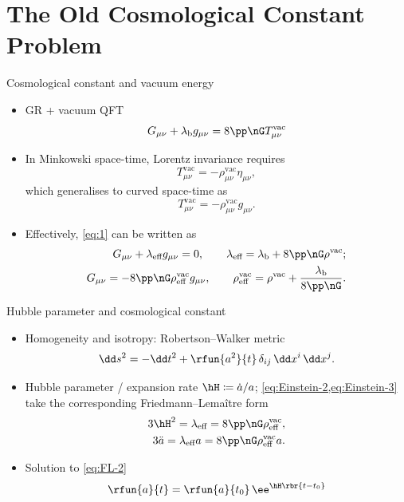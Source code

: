 \documentclass{beamer}
\begin{document}
\section{The Old Cosmological Constant Problem}

\begin{frame}{Cosmological constant and vacuum energy}
\begin{itemize}
\item GR + vacuum QFT
\begin{equation}
G_{\mu\nu} + \lambda_\text{b} g_{\mu\nu} = 8\pp\nG T^\text{vac}_{\mu\nu}
\label{eq:1}
\end{equation}
\item In Minkowski space-time, Lorentz invariance requires
\begin{equation}
T^\text{vac}_{\mu\nu} = -\rho^\text{vac}_{\mu\nu} \eta_{\mu\nu},
\end{equation}
which generalises to curved space-time as
\begin{equation}
T^\text{vac}_{\mu\nu} = -\rho^\text{vac}_{\mu\nu} g_{\mu\nu}.
\end{equation}
\item Effectively, \cref{eq:1} can be written as
\begin{align}
G_{\mu\nu} + \lambda_\text{eff} g_{\mu\nu} = 0, \qquad
\lambda_\text{eff} = \lambda_\text{b} + 8\pp\nG\rho^\text{vac};
\label{eq:Einstein-2}\\
G_{\mu\nu} = -8\pp\nG\rho^\text{vac}_\text{eff} g_{\mu\nu}, \qquad
\rho^\text{vac}_\text{eff} = \rho^\text{vac} +
\frac{\lambda_\text{b}}{8\pp\nG}
\label{eq:Einstein-3}.
\end{align}
\end{itemize}
\end{frame}

\begin{frame}{Hubble parameter and cosmological constant}
\begin{itemize}
\item Homogeneity and isotropy: Robertson--Walker metric
\begin{equation}
\dd s^2 = -\dd t^2 + \rfun{a^2}{t}\,\delta_{ij}\,\dd x^i\,\dd x^j.
\end{equation}
\item Hubble parameter / expansion rate $\hH \coloneqq \dot{a}/a$;
\cref{eq:Einstein-2,eq:Einstein-3} take the corresponding Friedmann--Lemaître
form
\begin{align}
3\hH^2 = \lambda_\text{eff} = 8\pp\nG\rho^\text{vac}_\text{eff},\\
3\ddot{a} = \lambda_\text{eff} a = 8\pp\nG\rho^\text{vac}_\text{eff} a.
\label{eq:FL-2}
\end{align}

\item Solution to \cref{eq:FL-2}
\begin{equation}
\rfun{a}{t} = \rfun{a}{t_0}\,\ee^{\hH \rbr{t-t_0}}
\end{equation}

\end{itemize}

\end{frame}
\end{document}
